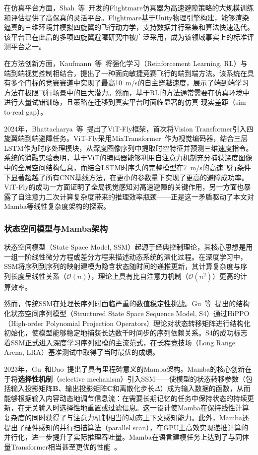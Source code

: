 \documentclass[12pt,a4paper]{article}
\numberwithin{equation}{section}
\numberwithin{figure}{section}
\numberwithin{table}{section}
\begin{document}
在仿真平台方面，Shah~等~\cite{shah2017flightmare}开发的Flightmare仿真器为高速避障策略的大规模训练和评估提供了高保真的灵活平台。Flightmare基于Unity物理引擎构建，能够渲染逼真的三维环境并模拟四旋翼的飞行动力学，支持数据并行采集和算法快速迭代。该平台已在此后的多项四旋翼避障研究中被广泛采用，成为该领域事实上的标准评测平台之一。

在方法创新方面，Kaufmann~等~\cite{kaufmann2020beauty}将强化学习（Reinforcement Learning, RL）与端到端视觉控制相结合，提出了一种面向敏捷竞赛飞行的端到端方法。该系统在具有多个门标的竞赛赛道中实现了最高10~m/s的自主穿越速度，展示了端到端学习方法在极限飞行场景中的巨大潜力。然而，基于RL的方法通常需要在仿真环境中进行大量试错训练，且策略在迁移到真实平台时面临显著的仿真-现实差距（sim-to-real gap）。

2024年，Bhattacharya~等~\cite{bhattacharya2024vitfly}提出了ViT-Fly框架，首次将Vision Transformer引入四旋翼端到端避障任务。ViT-Fly采用MixTransformer~\cite{xie2021segformer}作为视觉编码器，结合三层LSTM作为时序处理模块，从深度图像序列中提取时空特征并预测三维速度指令。系统的消融实验表明，基于ViT的编码器能够利用自注意力机制充分捕获深度图像中的全局空间结构信息，而结合LSTM时序头的完整模型在7~m/s的高速飞行条件下显著超越了所有CNN基线方法，在更小的参数量下实现了更高的避障成功率。ViT-Fly的成功一方面证明了全局视觉感知对高速避障的关键作用，另一方面也暴露了自注意力二次计算复杂度带来的推理效率瓶颈——正是这一矛盾驱动了本文对Mamba等线性复杂度架构的探索。

\subsubsection{状态空间模型与Mamba架构}

状态空间模型（State Space Model, SSM）起源于经典控制理论，其核心思想是用一组一阶线性微分方程或差分方程来描述动态系统的演化过程。在深度学习中，SSM将序列到序列的映射建模为隐含状态随时间的递推更新，其计算复杂度与序列长度呈线性关系（$\mathcal{O}(n)$），理论上具有比自注意力机制（$\mathcal{O}(n^2)$）更高的计算效率。

然而，传统SSM在处理长序列时面临严重的数值稳定性挑战。Gu~等~\cite{gu2022s4}提出的结构化状态空间序列模型（Structured State Space Sequence Model, S4）通过HiPPO（High-order Polynomial Projection Operators）理论对状态转移矩阵进行结构化初始化，使模型能够稳定地捕获长达数千时间步的序列依赖关系。S4的成功标志着SSM正式进入深度学习序列建模的主流范式，在长程竞技场（Long Range Arena, LRA）基准测试中取得了当时最优的成绩。

2023年，Gu~和Dao~\cite{gu2023mamba}提出了具有里程碑意义的Mamba架构。Mamba的核心创新在于将\textbf{选择性机制}（selective mechanism）引入SSM——使模型的状态转移参数（包括输入投影矩阵$\mathbf{B}$、输出投影矩阵$\mathbf{C}$和离散化步长$\Delta$）成为输入数据的函数，从而能够根据输入内容动态地调节信息流：在需要长期记忆的任务中保持状态的持续更新，在无关输入时选择性地重置或过滤信息。这一设计使Mamba在保持线性计算复杂度的同时获得了与注意力机制相当的动态上下文感知能力。此外，Mamba还提出了硬件感知的并行扫描算法（parallel scan），在GPU上高效实现递推计算的并行化，进一步提升了实际推理吞吐量。Mamba在语言建模任务上达到了与同体量Transformer相当甚至更优的性能~\cite{gu2023mamba}。
\end{document}

